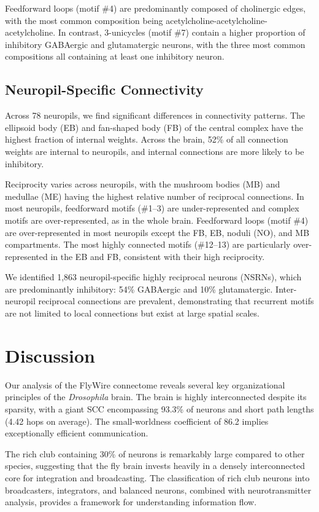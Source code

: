 \documentclass{article}
\begin{document}
Feedforward loops (motif \#4) are predominantly composed of cholinergic edges, with the most common composition being acetylcholine-acetylcholine-acetylcholine. In contrast, 3-unicycles (motif \#7) contain a higher proportion of inhibitory GABAergic and glutamatergic neurons, with the three most common compositions all containing at least one inhibitory neuron.

\subsection{Neuropil-Specific Connectivity}

Across 78 neuropils, we find significant differences in connectivity patterns. The ellipsoid body (EB) and fan-shaped body (FB) of the central complex have the highest fraction of internal weights. Across the brain, 52\% of all connection weights are internal to neuropils, and internal connections are more likely to be inhibitory.

Reciprocity varies across neuropils, with the mushroom bodies (MB) and medullae (ME) having the highest relative number of reciprocal connections. In most neuropils, feedforward motifs (\#1--3) are under-represented and complex motifs are over-represented, as in the whole brain. Feedforward loops (motif \#4) are over-represented in most neuropils except the FB, EB, noduli (NO), and MB compartments. The most highly connected motifs (\#12--13) are particularly over-represented in the EB and FB, consistent with their high reciprocity.

We identified 1,863 neuropil-specific highly reciprocal neurons (NSRNs), which are predominantly inhibitory: 54\% GABAergic and 10\% glutamatergic. Inter-neuropil reciprocal connections are prevalent, demonstrating that recurrent motifs are not limited to local connections but exist at large spatial scales.

\section{Discussion}

Our analysis of the FlyWire connectome reveals several key organizational principles of the \textit{Drosophila} brain. The brain is highly interconnected despite its sparsity, with a giant SCC encompassing 93.3\% of neurons and short path lengths (4.42 hops on average). The small-worldness coefficient of 86.2 implies exceptionally efficient communication.

The rich club containing 30\% of neurons is remarkably large compared to other species, suggesting that the fly brain invests heavily in a densely interconnected core for integration and broadcasting. The classification of rich club neurons into broadcasters, integrators, and balanced neurons, combined with neurotransmitter analysis, provides a framework for understanding information flow.
\end{document}
